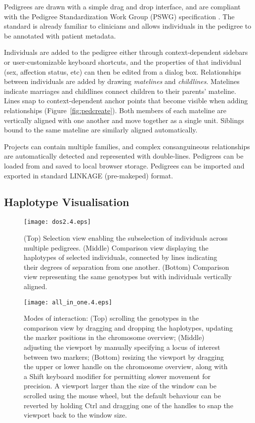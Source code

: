 \documentclass{bioinfo}
\numberwithin{equation}{section}
\begin{document}
Pedigrees are drawn with a simple drag and drop interface, and are compliant with the Pedigree Standardization Work Group (PSWG) specification \citep{pswg1,pswg2}. The standard is already familiar to clinicians and allows individuals in the pedigree to be annotated with patient metadata. 

Individuals are added to the pedigree either through context-dependent sidebars or user-customizable keyboard shortcuts, and the properties of that individual (sex, affection status, etc) can then be edited from a dialog box. Relationships between individuals are added by drawing {\it matelines} and {\it childlines}. Matelines indicate marriages and childlines connect children to their parents' mateline. Lines snap to context-dependent anchor points that become visible when adding relationships (Figure~\ref{fig:pedcreate}). Both members of each mateline are vertically aligned with one another and move together as a single unit. Siblings bound to the same mateline are similarly aligned automatically.

Projects can contain multiple families, and complex consanguineous relationships are automatically detected and represented with double-lines. Pedigrees can be loaded from and saved to local browser storage. Pedigrees can be imported and exported in standard LINKAGE (pre-makeped) format.
	
\subsection{Haplotype Visualisation}

\begin{figure}[!tpb]
	\centerline{\texttt{[image: dos2.4.eps]}}\caption{(Top) Selection view enabling the subselection of individuals across multiple pedigrees. (Middle) Comparison view displaying the haplotypes of selected individuals, connected by lines indicating their degrees of separation from one another. (Bottom) Comparison view representing the same genotypes but with individuals vertically aligned.}\label{fig:dos}
\end{figure}

\begin{figure}[!tpb]
	\centerline{\texttt{[image: all\_in\_one.4.eps]}}\caption{Modes of interaction: (Top) scrolling the genotypes in the comparison view by dragging and dropping the haplotypes, updating the marker positions in the chromosome overview; (Middle) adjusting the viewport by manually specifying a locus of interest between two markers; (Bottom) resizing the viewport by dragging the upper or lower handle on the chromosome overview, along with a Shift keyboard modifier for permitting slower movement for precision. A viewport larger than the size of the window can be scrolled using the mouse wheel, but the default behaviour can be reverted by holding Ctrl and dragging one of the handles to snap the viewport back to the window size.}\label{fig:viewportmanip}
\end{figure}	
\end{document}
